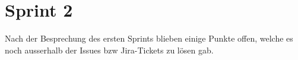 

\section{Sprint 2}\label{sec:sprint2}
Nach der Besprechung des ersten Sprints blieben einige Punkte offen, welche es noch ausserhalb der
Issues bzw Jira-Tickets zu lösen gab.